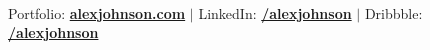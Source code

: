 \documentclass[11pt,letterpaper]{article}
\begin{document}
\vspace{0.5cm}
\begin{center}
  \\[0.2cm]
  {\small\color{dark} Portfolio: \href{https://alexjohnson.com}{\textbf{alexjohnson.com}} $|$
  LinkedIn: \href{https://linkedin.com/in/alexjohnson}{\textbf{/alexjohnson}} $|$
  Dribbble: \href{https://dribbble.com/alexjohnson}{\textbf{/alexjohnson}}}
\end{center}
\end{document}
